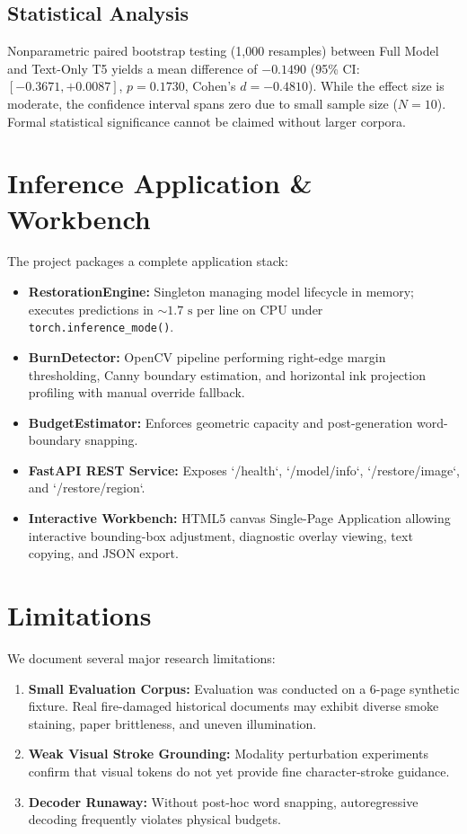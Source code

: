 \documentclass[10pt,twocolumn]{article}
\begin{document}
\subsection{Statistical Analysis}
Nonparametric paired bootstrap testing (1,000 resamples) between Full Model and Text-Only T5 yields a mean difference of $-0.1490$ (95\% CI: $[-0.3671, +0.0087]$, $p = 0.1730$, Cohen's $d = -0.4810$). While the effect size is moderate, the confidence interval spans zero due to small sample size ($N = 10$). Formal statistical significance cannot be claimed without larger corpora.

\section{Inference Application & Workbench}
The project packages a complete application stack:
\begin{itemize}
    \item \textbf{RestorationEngine:} Singleton managing model lifecycle in memory; executes predictions in $\sim 1.7\text{ s}$ per line on CPU under \texttt{torch.inference\_mode()}.
    \item \textbf{BurnDetector:} OpenCV pipeline performing right-edge margin thresholding, Canny boundary estimation, and horizontal ink projection profiling with manual override fallback.
    \item \textbf{BudgetEstimator:} Enforces geometric capacity and post-generation word-boundary snapping.
    \item \textbf{FastAPI REST Service:} Exposes `/health`, `/model/info`, `/restore/image`, and `/restore/region`.
    \item \textbf{Interactive Workbench:} HTML5 canvas Single-Page Application allowing interactive bounding-box adjustment, diagnostic overlay viewing, text copying, and JSON export.
\end{itemize}

\section{Limitations}
We document several major research limitations:
\begin{enumerate}
    \item \textbf{Small Evaluation Corpus:} Evaluation was conducted on a 6-page synthetic fixture. Real fire-damaged historical documents may exhibit diverse smoke staining, paper brittleness, and uneven illumination.
    \item \textbf{Weak Visual Stroke Grounding:} Modality perturbation experiments confirm that visual tokens do not yet provide fine character-stroke guidance.
    \item \textbf{Decoder Runaway:} Without post-hoc word snapping, autoregressive decoding frequently violates physical budgets.
\end{enumerate}
\end{document}

